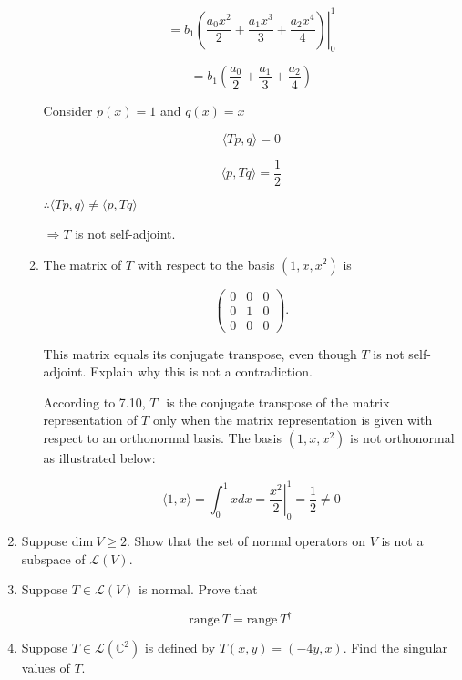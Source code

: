 \documentclass[fleqn]{article}
\makeatletter
\newenvironment{equationCenter}{\@fleqnfalse\begin{equation*}}{\end{equation*}}
\makeatother
\begin{document}
\begin{enumerate}[nolistsep]
\begin{enumerate}[nolistsep]
			\begin{equation*}
				= b_1\left.\left(\frac{a_0x^2}{2} + \frac{a_1x^3}{3} + \frac{a_2x^4}{4}\right)\right\vert_{0}^{1}
			\end{equation*}
			
			\begin{equation*}
				= b_1\left(\frac{a_0}{2} + \frac{a_1}{3} + \frac{a_2}{4}\right)
			\end{equation*}
			
			Consider $p(x) = 1$ and $q(x) = x$
			
			\begin{equation*}
				\langle Tp, q \rangle = 0
			\end{equation*}
			
			\begin{equation*}
				\langle p, Tq \rangle = \frac{1}{2}
			\end{equation*}
			
			$\therefore \langle Tp, q \rangle \neq \langle p, Tq \rangle$
			
			$\Rightarrow T$ is not self-adjoint.
			
			\item The matrix of $T$ with respect to the basis $(1,x,x^2)$ is
			
			\begin{equationCenter}
				\begin{pmatrix}
					0 & 0 & 0\\
					0 & 1 & 0\\
					0 & 0 & 0
				\end{pmatrix}.
			\end{equationCenter}
			
			This matrix equals its conjugate transpose, even though $T$ is not self-adjoint. Explain why this is not a contradiction.
			
			According to 7.10, $T^{\dag}$ is the conjugate transpose of the matrix representation of $T$ only when the matrix representation is given with respect to an orthonormal basis. The basis $(1,x,x^2)$ is not orthonormal as illustrated below:
			
			\begin{equation*}
				\langle 1, x \rangle = \int_{0}^{1}{xdx} = \left.\frac{x^2}{2}\right\vert_{0}^{1} = \frac{1}{2} \neq 0
			\end{equation*}
		\end{enumerate}
		
		\item Suppose $\text{dim}\ V \geq 2$. Show that the set of normal operators on $V$ is not a subspace of $\mathcal{L}(V)$.
		
		\item Suppose $T \in \mathcal{L}(V)$ is normal. Prove that
		
			\begin{equationCenter}
				\text{range}\ T = \text{range}\ T^{\dag}
			\end{equationCenter}
			
		\item Suppose $T \in \mathcal{L}(\mathbb{C}^2)$ is defined by $T(x,y) = (-4y, x)$. Find the singular values of $T$.
	\end{enumerate}
\end{document}
